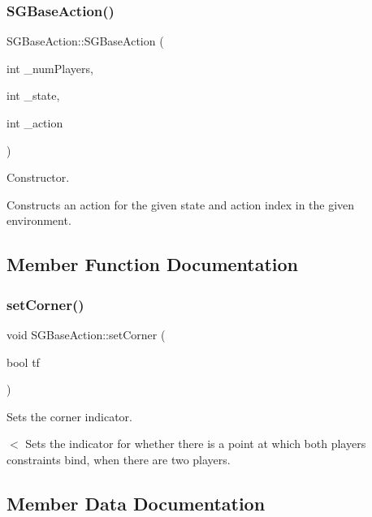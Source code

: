\subsubsection{\texorpdfstring{S\+G\+Base\+Action()}{SGBaseAction()}\hspace{0.1cm}{\footnotesize\ttfamily [3/3]}}
{\footnotesize\ttfamily S\+G\+Base\+Action\+::\+S\+G\+Base\+Action (\begin{DoxyParamCaption}\item[{int}]{\+\_\+num\+Players,  }\item[{int}]{\+\_\+state,  }\item[{int}]{\+\_\+action }\end{DoxyParamCaption})\hspace{0.3cm}{\ttfamily [inline]}}



Constructor. 

Constructs an action for the given state and action index in the given environment. 

\subsection{Member Function Documentation}
\mbox{\label{classSGBaseAction_a42092d69ccab82c32d31e2f762b669bd}} 
\subsubsection{\texorpdfstring{set\+Corner()}{setCorner()}}
{\footnotesize\ttfamily void S\+G\+Base\+Action\+::set\+Corner (\begin{DoxyParamCaption}\item[{bool}]{tf }\end{DoxyParamCaption})\hspace{0.3cm}{\ttfamily [inline]}}



Sets the corner indicator. 

$<$ Sets the indicator for whether there is a point at which both players constraints bind, when there are two players. 

\subsection{Member Data Documentation}
\mbox{\label{classSGBaseAction_af293adc10da2dbb5a388a2fbcca0c67c}} 
